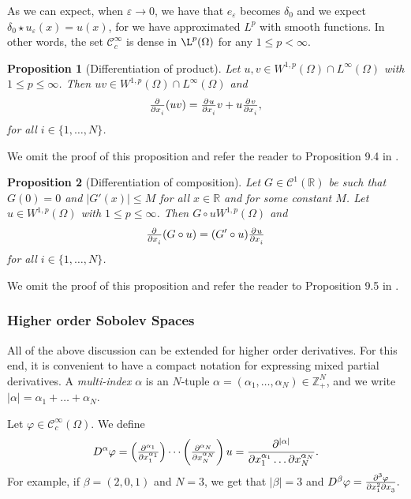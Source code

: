 \documentclass[a4paper,doc,11pt]{article}
\newtheorem{proposition}{Proposition}[theorem]
\newcommand{\R}{\mathbb{R}}
\newcommand{\Z}{\mathbb{Z}}
\newcommand{\CC}{\mathcal{C}}
\begin{document}
As we can expect, when \(\varepsilon \to 0\), we have that \( e_\varepsilon \) becomes \(\delta_0\) and we expect \( \delta_0 \star u_\varepsilon (x)  = u(x)\), for we have approximated \(L^p\) with smooth functions. In other words, the set \(\CC_c^\infty\) is dense in \(\L^p (\Omega)\) for any \( 1 \leq p < \infty\). 

\begin{proposition}[Differentiation of product]
    Let \(u,v \in W^{1,p} (\Omega) \cap L^\infty (\Omega)\) with \( 1\leq p \leq \infty\). Then \(uv \in W^{1,p} (\Omega) \cap L^{\infty} (\Omega)\) and
    \[
        \pd{ }{x_i} (uv) = \pd{u}{x_i} v + u \pd{v}{x_i},
    \]
    for all \( i \in \{1,\ldots, N\}\).
\end{proposition}

We omit the proof of this proposition and refer the reader to Proposition 9.4 in \citep{Brezis2010}.

\begin{proposition}[Differentiation of composition]
    Let \(G \in \CC^1(\R)\) be such that \( G(0) = 0\) and \( |G'(x)| \leq M  \) for all \( x\in \R\) and for some constant \(M\). Let \( u\in W^{1,p} (\Omega)\) with \( 1\leq p \leq \infty\). Then \(G \circ u W^{1,p}(\Omega)\) and
    \[
        \pd{ }{x_i} (G \circ u) = (G'\circ u) \pd{u}{x_i}
    \]
    for all \( i \in \{1,\ldots, N\}\).
\end{proposition}

We omit the proof of this proposition and refer the reader to Proposition 9.5 in \citep{Brezis2010}.

\subsubsection{Higher order Sobolev Spaces}

All of the above discussion can be extended for higher order derivatives. For this end, it is convenient to have a compact notation for expressing mixed partial derivatives. A \emph{multi-index} \(\alpha\) is an \(N\)-tuple \( \alpha = (\alpha_1, \ldots, \alpha_N) \in \Z^N_+\), and we write \(|\alpha| = \alpha_1 + \ldots + \alpha_N\). 

Let \( \varphi \in \CC_c^\infty (\Omega)\). We define 
\[
    D^\alpha \varphi = \left( \pd[\alpha_1]{ }{x_1} \right) \cdots \left( \pd[\alpha_N]{ }{x_N} \right) u = \frac{\partial^{|\alpha|}}{ \partial x_1^{\alpha_1} \ldots \partial x_N^{\alpha_N} }.
\]
For example, if \(\beta = (2,0,1)\) and \(N = 3\), we get that \( |\beta| = 3\) and
\(
    D^\beta \varphi = \md{\varphi}{3}{x_1}{2}{x_3}{}.
\)
\end{document}
